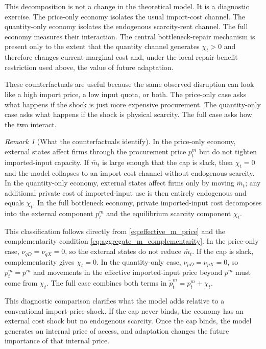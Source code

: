 ﻿\documentclass[12pt]{article}
\theoremstyle{remark}
\newtheorem{remark}{Remark}
\begin{document}
This decomposition is not a change in the theoretical model. It is a diagnostic exercise. The
price-only economy isolates the usual import-cost channel. The quantity-only economy isolates the
endogenous scarcity-rent channel. The full economy measures their interaction. The central
bottleneck-repair mechanism is present only to the extent that the quantity channel generates
$\chi_t>0$ and therefore changes current marginal cost and, under the local repair-benefit
restriction used above, the value of future adaptation.

These counterfactuals are useful because the same observed disruption can look like a high import
price, a low input quota, or both. The price-only case asks what happens if the shock is just more
expensive procurement. The quantity-only case asks what happens if the shock is physical scarcity.
The full case asks how the two interact.

\begin{remark}[What the counterfactuals identify]\label{rem:counterfactual_identification}
In the price-only economy, external states affect firms through the procurement price $p_t^m$ but
do not tighten imported-input capacity. If $\bar m_t$ is large enough that the cap is slack, then
$\chi_t=0$ and the model collapses to an import-cost channel without endogenous scarcity. In the
quantity-only economy, external states affect firms only by moving $\bar m_t$; any additional
private cost of imported-input use is then entirely endogenous and equals $\chi_t$. In the full
bottleneck economy, private imported-input cost decomposes into the external component $p_t^m$ and
the equilibrium scarcity component $\chi_t$.

This classification follows directly from \eqref{eq:effective_m_price} and the complementarity condition
\eqref{eq:aggregate_m_complementarity}. In the price-only case, $\nu_{qD}=\nu_{qX}=0$, so the
external states do not reduce $\bar m_t$. If the cap is slack, complementarity gives $\chi_t=0$.
In the quantity-only case, $\nu_{pD}=\nu_{pX}=0$, so $p_t^m=\bar p^m$ and movements in the
effective imported-input price beyond $\bar p^m$ must come from $\chi_t$. The full case combines
both terms in $\tilde p_t^m=p_t^m+\chi_t$.
\end{remark}

This diagnostic comparison clarifies what the model adds relative to a conventional import-price shock. If
the cap never binds, the economy has an external cost shock but no endogenous scarcity. Once the
cap binds, the model generates an internal price of access, and adaptation changes the future
importance of that internal price.
\end{document}
